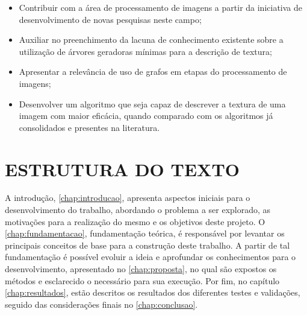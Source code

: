 \begin{itemize}
    \item Contribuir com a área de processamento de imagens a partir da iniciativa de desenvolvimento de novas pesquisas neste campo;
    \item Auxiliar no preenchimento da lacuna de conhecimento existente sobre a utilização de árvores geradoras mínimas para a descrição de textura;
    \item Apresentar a relevância de uso de grafos em etapas do processamento de imagens;
    \item Desenvolver um algoritmo que seja capaz de descrever a textura de uma imagem com maior eficácia, quando comparado com os algoritmos já consolidados e presentes na literatura.
\end{itemize}

\begin{comment}
\par No tópico a seguir serão abordados em mais detalhes as etapas percorridas para tal implementação, bem como o posterior esclarecimento da divisão do trabalho escrito.
\end{comment}

\section{ESTRUTURA DO TEXTO}
\label{sec:organizacaodoc}

\par A introdução, \autoref{chap:introducao}, apresenta aspectos iniciais para o desenvolvimento do trabalho, abordando o problema a ser explorado, as motivações para a realização do mesmo e os objetivos deste projeto. O \autoref{chap:fundamentacao}, fundamentação teórica, é responsável por levantar os principais conceitos de base para a construção deste trabalho. A partir de tal fundamentação é possível evoluir a ideia e aprofundar os conhecimentos para o desenvolvimento, apresentado no \autoref{chap:proposta}, no qual são expostos os métodos e esclarecido o necessário para sua execução. Por fim, no capítulo \autoref{chap:resultados}, estão descritos os resultados dos diferentes testes e validações, seguido das considerações finais no \autoref{chap:conclusao}.
